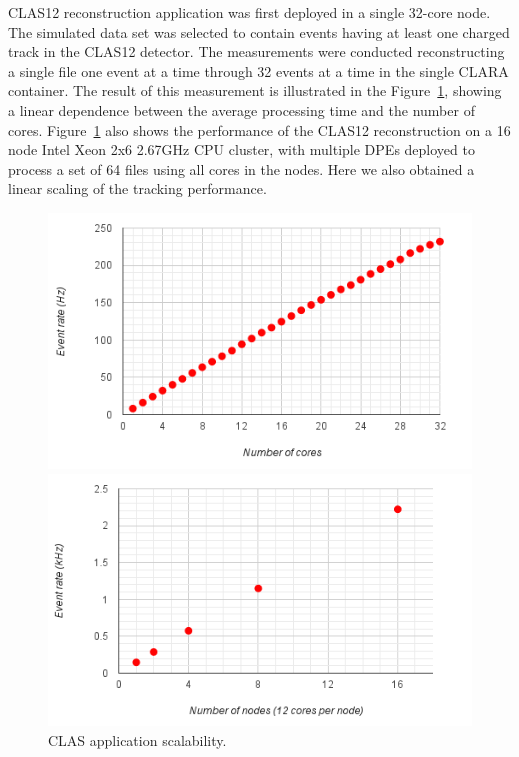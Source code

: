 \documentclass[a4paper]{jpconf}
\begin{document}
CLAS12 reconstruction application was first deployed in a single 32-core node.
The simulated data set was selected to contain events having at least one
charged track in the CLAS12 detector.
The measurements were conducted reconstructing a single file one event at a
time through 32 events at a time in the single CLARA container.
The result of this measurement is illustrated in the Figure~\ref{fig:results},
showing a linear dependence between the average processing time and the number
of cores.
Figure~\ref{fig:results} also shows the performance of the CLAS12
reconstruction on a 16 node Intel Xeon 2x6 2.67GHz CPU cluster,
with multiple DPEs deployed
to process a set of 64 files using all cores in the nodes.
Here we also obtained a linear scaling of the tracking performance.

\begin{figure}[h]
  \begin{center}
    \begin{minipage}{0.48\textwidth}
      \includegraphics[width=\textwidth]{figures/coat-multicore}
    \end{minipage}%
    \begin{minipage}{0.48\textwidth}
      \includegraphics[width=\textwidth]{figures/coat-multinode}
    \end{minipage}
  \end{center}
  \caption{CLAS application scalability.}
  \label{fig:results}
\end{figure}
\end{document}
